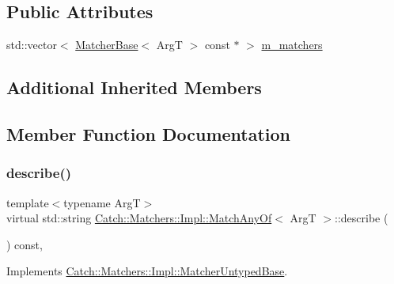 \subsection*{Public Attributes}
\begin{DoxyCompactItemize}
\item 
std\+::vector$<$ \mbox{\hyperlink{struct_catch_1_1_matchers_1_1_impl_1_1_matcher_base}{Matcher\+Base}}$<$ ArgT $>$ const  $\ast$ $>$ \mbox{\hyperlink{struct_catch_1_1_matchers_1_1_impl_1_1_match_any_of_a1fb1119e6110dc15b8d5262ec0aeddd5}{m\+\_\+matchers}}
\end{DoxyCompactItemize}
\subsection*{Additional Inherited Members}


\subsection{Member Function Documentation}
\mbox{\label{struct_catch_1_1_matchers_1_1_impl_1_1_match_any_of_a020f5d7889d8cd8be9ad309c690147b6}} 
\subsubsection{\texorpdfstring{describe()}{describe()}}
{\footnotesize\ttfamily template$<$typename ArgT$>$ \\
virtual std\+::string \mbox{\hyperlink{struct_catch_1_1_matchers_1_1_impl_1_1_match_any_of}{Catch\+::\+Matchers\+::\+Impl\+::\+Match\+Any\+Of}}$<$ ArgT $>$\+::describe (\begin{DoxyParamCaption}{ }\end{DoxyParamCaption}) const\hspace{0.3cm}{\ttfamily [inline]}, {\ttfamily [virtual]}}



Implements \mbox{\hyperlink{class_catch_1_1_matchers_1_1_impl_1_1_matcher_untyped_base_a91d3a907dbfcbb596077df24f6e11fe2}{Catch\+::\+Matchers\+::\+Impl\+::\+Matcher\+Untyped\+Base}}.

\mbox{\label{struct_catch_1_1_matchers_1_1_impl_1_1_match_any_of_a73be317ecf5919af855af96d68e714b9}} 

